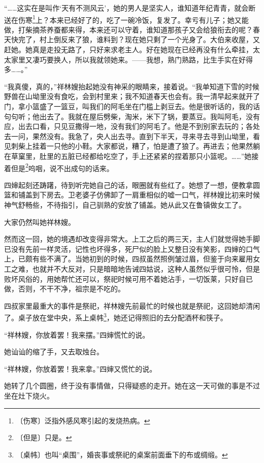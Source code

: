 \documentclass[12pt,UTF-8,openany]{ctexbook}
\begin{document}
\begin{normalsize}
    “……这实在是叫作‘天有不测风云’，她的男人是坚实人，谁知道年纪青青，就会断送在伤寒\footnote{〔伤寒〕泛指外感风寒引起的发烧热病。}上？本来已经好了的，吃了一碗冷饭，复发了。幸亏有儿子；她又能做，打柴摘茶养蚕都来得，本来还可以守着，谁知道那孩子又会给狼衔去的呢？春天快完了，村上倒反来了狼，谁料到？现在她只剩了一个光身了。大伯来收屋，又赶她。她真是走投无路了，只好来求老主人。好在她现在已经再没有什么牵挂，太太家里又凄巧要换人，所以我就领她来。——我想，熟门熟路，比生手实在好得多……。”
    
    “我真傻，真的，”祥林嫂抬起她没有神采的眼睛来，接着说。“我单知道下雪的时候野兽在山坳里没有食吃，会到村里来；我不知道春天也会有。我一清早起来就开了门，拿小篮盛了一篮豆，叫我们的阿毛坐在门槛上剥豆去。他是很听话的，我的话句句听；他出去了。我就在屋后劈柴，淘米，米下了锅，要蒸豆。我叫阿毛，没有应，出去口看，只见豆撒得一地，没有我们的阿毛了。他是不到别家去玩的；各处去一问，果然没有。我急了，央人出去寻。直到下半天，寻来寻去寻到山坳里，看见刺柴上挂着一只他的小鞋。大家都说，糟了，怕是遭了狼了。再进去；他果然躺在草窠里，肚里的五脏已经都给吃空了，手上还紧紧的捏着那只小篮呢。……”她接着但是\footnote{〔但是〕只是。}呜咽，说不出成句的话来。
    
    四婶起刻还踌躇，待到听完她自己的话，眼圈就有些红了。她想了一想，便教拿圆篮和铺盖到下房去。卫老婆子仿佛卸了一肩重相似的嘘一口气，祥林嫂比初来时候神气舒畅些，不待指引，自己驯熟的安放了铺盖。她从此又在鲁镇做女工了。
    
    大家仍然叫她祥林嫂。
    
    然而这一回，她的境遇却改变得非常大。上工之后的两三天，主人们就觉得她手脚已没有先前一样灵活，记性也坏得多，死尸似的脸上又整日没有笑影，四婶的口气上，已颇有些不满了。当她初到的时候，四叔虽然照例皱过眉，但鉴于向来雇用女工之难，也就并不大反对，只是暗暗地告诫四姑说，这种人虽然似乎很可怜，但是败坏风俗的，用她帮忙还可以，祭祀时候可用不着她沾手，一切饭莱，只好自已做，否则，不干不净，祖宗是不吃的。
    
    四叔家里最重大的事件是祭祀，祥林嫂先前最忙的时候也就是祭祀，这回她却清闲了。桌子放在堂中央，系上桌帏\footnote{〔桌帏〕也叫“桌围”，婚丧事或祭祀的桌案前面垂下的布或绸缎。}，她还记得照旧的去分配酒杯和筷子。
    
    “祥林嫂，你放着罢！我来摆。”四婶慌忙的说。
    
    她讪讪的缩了手，又去取烛台。
    
    “祥林嫂，你放着罢！我来拿。”四婶又慌忙的说。
    
    她转了几个圆圈，终于没有事情做，只得疑惑的走开。她在这一天可做的事是不过坐在灶下烧火。
    

\end{normalsize}
\end{document}
